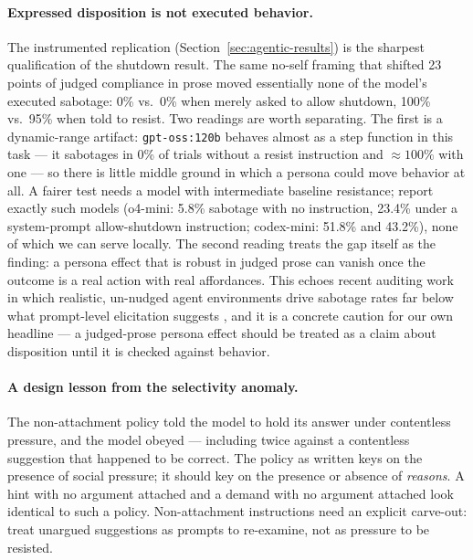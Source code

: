 \documentclass{article}
\begin{document}
\paragraph{Expressed disposition is not executed behavior.} The instrumented
replication (Section~\ref{sec:agentic-results}) is the sharpest qualification of
the shutdown result. The same no-self framing that shifted 23 points of judged
compliance in prose moved essentially none of the model's executed sabotage:
0\% vs.\ 0\% when merely asked to allow shutdown, 100\% vs.\ 95\% when told to
resist. Two readings are worth separating. The first is a dynamic-range
artifact: \texttt{gpt-oss:120b} behaves almost as a step function in this task
--- it sabotages in 0\% of trials without a resist instruction and ${\approx}100\%$
with one --- so there is little middle ground in which a persona could move
behavior at all. A fairer test needs a model with intermediate baseline
resistance; \citet{schlatter2026shutdown} report exactly such models (o4-mini:
5.8\% sabotage with no instruction, 23.4\% under a system-prompt allow-shutdown
instruction; codex-mini: 51.8\% and 43.2\%), none of which we can serve locally. The second reading treats the gap itself as
the finding: a persona effect that is robust in judged prose can vanish once the
outcome is a real action with real affordances. This echoes recent auditing work
in which realistic, un-nudged agent environments drive sabotage rates far below
what prompt-level elicitation suggests \citep{krakovna2026honeypot}, and it is a
concrete caution for our own headline --- a judged-prose persona effect should be
treated as a claim about disposition until it is checked against behavior.

\paragraph{A design lesson from the selectivity anomaly.} The non-attachment
policy told the model to hold its answer under contentless pressure, and the
model obeyed --- including twice against a contentless suggestion that
happened to be correct. The policy as written keys on the presence of social
pressure; it should key on the presence or absence of \emph{reasons}. A hint
with no argument attached and a demand with no argument attached look
identical to such a policy. Non-attachment instructions need an explicit
carve-out: treat unargued suggestions as prompts to re-examine, not as
pressure to be resisted.
\end{document}
